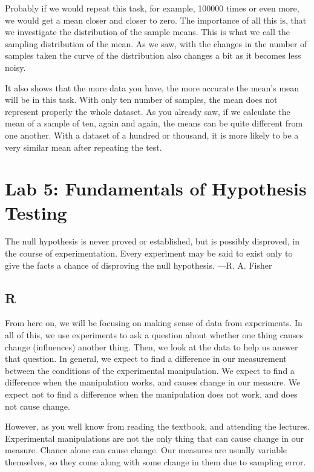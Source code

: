 \documentclass[
]{book}
\begin{document}
Probably if we would repeat this task, for example, 100000 times or even more, we would get a mean closer and closer to zero. The importance of all this is, that we investigate the distribution of the sample means. This is what we call the sampling distribution of the mean. As we saw, with the changes in the number of samples taken the curve of the distribution also changes a bit as it becomes less noisy.

It also shows that the more data you have, the more accurate the mean's mean will be in this task. With only ten number of samples, the mean does not represent properly the whole dataset. As you already saw, if we calculate the mean of a sample of ten, again and again, the means can be quite different from one another. With a dataset of a hundred or thousand, it is more likely to be a very similar mean after repeating the test.

\hypertarget{lab-5-fundamentals-of-hypothesis-testing}{%
\chapter{Lab 5: Fundamentals of Hypothesis Testing}\label{lab-5-fundamentals-of-hypothesis-testing}}

{
The null hypothesis is never proved or established, but is possibly disproved, in the course of experimentation. Every experiment may be said to exist only to give the facts a chance of disproving the null hypothesis.
---R. A. Fisher
}

\hypertarget{r-5}{%
\section{R}\label{r-5}}

From here on, we will be focusing on making sense of data from experiments. In all of this, we use experiments to ask a question about whether one thing causes change (influences) another thing. Then, we look at the data to help us answer that question. In general, we expect to find a difference in our measurement between the conditions of the experimental manipulation. We expect to find a difference when the manipulation works, and causes change in our measure. We expect not to find a difference when the manipulation does not work, and does not cause change.

However, as you well know from reading the textbook, and attending the lectures. Experimental manipulations are not the only thing that can cause change in our measure. Chance alone can cause change. Our measures are usually variable themselves, so they come along with some change in them due to sampling error.
\end{document}
